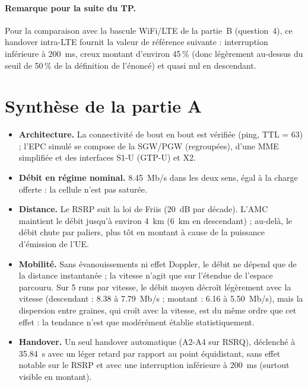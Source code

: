 \paragraph{Remarque pour la suite du TP.} Pour la comparaison avec la bascule
WiFi/LTE de la partie~B (question~4), ce handover intra-LTE fournit la valeur de
référence suivante : interruption inférieure à \SI{200}{ms}, creux montant
d'environ 45\,\% (donc légèrement au-dessus du seuil de 50\,\% de la
définition de l'énoncé) et quasi nul en descendant.

\section{Synthèse de la partie A}

\begin{itemize}[nosep]
\item \textbf{Architecture.} La connectivité de bout en bout est vérifiée (ping,
TTL = 63) ; l'EPC simulé se compose de la SGW/PGW (regroupées), d'une MME
simplifiée et des interfaces S1-U (GTP-U) et X2.
\item \textbf{Débit en régime nominal.} \SI{8.45}{Mb/s} dans les deux sens,
égal à la charge offerte : la cellule n'est pas saturée.
\item \textbf{Distance.} Le RSRP suit la loi de Friis (\SI{20}{dB} par décade).
L'AMC maintient le débit jusqu'à environ \SI{4}{km} (\SI{6}{km} en descendant) ;
au-delà, le débit chute par paliers, plus tôt en montant à cause de la
puissance d'émission de l'UE.
\item \textbf{Mobilité.} Sans évanouissements ni effet Doppler, le débit ne
dépend que de la distance instantanée ; la vitesse n'agit que sur l'étendue de
l'espace parcouru. Sur 5 runs par vitesse, le débit moyen décroît légèrement
avec la vitesse (descendant : \num{8.38} à \SI{7.79}{Mb/s} ; montant :
\num{6.16} à \SI{5.50}{Mb/s}), mais la dispersion entre graines, qui croît avec
la vitesse, est du même ordre que cet effet : la tendance n'est que
modérément établie statistiquement.
\item \textbf{Handover.} Un seul handover automatique (A2-A4 sur RSRQ), déclenché à
\SI{35.84}{s} avec un léger retard par rapport au point équidistant, sans effet
notable sur le RSRP et avec une interruption inférieure à \SI{200}{ms} (surtout
visible en montant).
\end{itemize}
